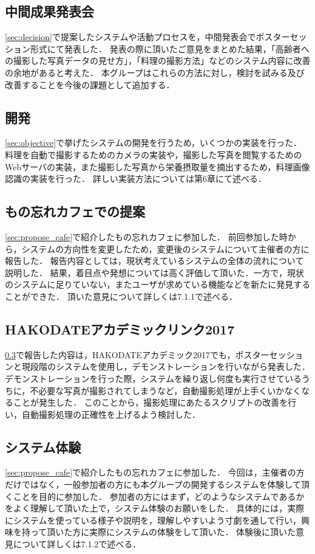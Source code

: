 \documentclass[../report]{subfiles}
\begin{document}
\subsection{中間成果発表会}
\ref{sec:decision}で提案したシステムや活動プロセスを，中間発表会でポスターセッション形式にて発表した．
発表の際に頂いたご意見をまとめた結果，「高齢者への撮影した写真データの見せ方」，「料理の撮影方法」などのシステム内容に改善の余地があると考えた．
本グループはこれらの方法に対し，検討を試みる及び改善することを今後の課題として追加する．

\subsection{開発}
\ref{sec:objective}で挙げたシステムの開発を行うため，いくつかの実装を行った．
料理を自動で撮影するためのカメラの実装や，撮影した写真を閲覧するためのWebサーバの実装，また撮影した写真から栄養摂取量を摘出するため，料理画像認識の実装を行った．
詳しい実装方法については第6章にて述べる．

\subsection{もの忘れカフェでの提案} \label{sec:propose_cafe2}
\ref{sec:propose_cafe}で紹介したもの忘れカフェに参加した．
前回参加した時から，システムの方向性を変更したため，変更後のシステムについて主催者の方に報告した．
報告内容としては，現状考えているシステムの全体の流れについて説明した．
結果，着目点や発想については高く評価して頂いた．一方で，現状のシステムに足りていない，またユーザが求めている機能などを新たに発見することができた．
頂いた意見について詳しくは7.1.1で述べる．

\subsection{HAKODATEアカデミックリンク2017}
\ref{sec:propose_cafe2}で報告した内容は，HAKODATEアカデミック2017でも，ポスターセッションと現段階のシステムを使用し，デモンストレーションを行いながら発表した．
デモンストレーションを行った際，システムを繰り返し何度も実行させているうちに，不必要な写真が撮影されてしまうなど，自動撮影処理が上手くいかなくなることが発生した．
このことから，撮影処理にあたるスクリプトの改善を行い，自動撮影処理の正確性を上げるよう検討した．

\subsection{システム体験}
\ref{sec:propose_cafe}で紹介したもの忘れカフェに参加した．
今回は，主催者の方だけではなく，一般参加者の方にも本グループの開発するシステムを体験して頂くことを目的に参加した．
参加者の方にはまず，どのようなシステムであるかをよく理解して頂いた上で，システム体験のお願いをした．
具体的には，実際にシステムを使っている様子や説明を，理解しやすいよう寸劇を通して行い，興味を持って頂いた方に実際にシステムの体験をして頂いた．
体験後に頂いた意見について詳しくは7.1.2で述べる．
\end{document}
